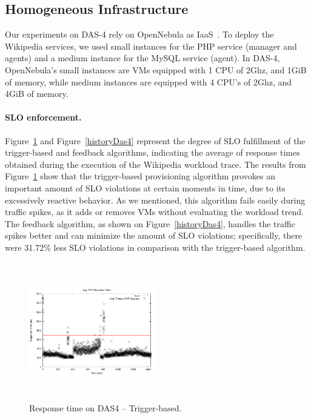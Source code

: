 
\subsection*{Homogeneous Infrastructure}

Our experiments on DAS-4 rely on OpenNebula as
IaaS~\cite{sotomayor_virtual_2009}. To deploy the Wikipedia services,
we used small instances for the PHP service (manager and agents) and a
medium instance for the MySQL service (agent). In DAS-4, OpenNebula's
small instances are VMs equipped with 1 CPU of 2Ghz, and 1GiB of
memory, while medium instances are equipped with 4 CPU's of 2Ghz, and
4GiB of memory.

\paragraph{SLO enforcement.}
Figure~\ref{naiveDas4} and Figure~\ref{historyDas4} represent the
degree of SLO fulfillment of the trigger-based and feedback
algorithms, indicating the average of response times obtained during
the execution of the Wikipedia workload trace. The results from
Figure~\ref{naiveDas4} show that the trigger-based provisioning
algorithm provokes an important amount of SLO violations at certain
moments in time, due to its excessively reactive behavior. As we
mentioned, this algorithm fails easily during traffic spikes, as it
adds or removes VMs without evaluating the workload trend. The
feedback algorithm, as shown on Figure~\ref{historyDas4}, handles the
traffic spikes better and can minimize the amount of SLO violations;
specifically, there were 31.72\% less SLO violations in comparison
with the trigger-based algorithm.


\begin{figure}[t]
\begin{center}
\includegraphics[width=0.49\textwidth, height=6cm]{./images/homogeneous/avgTimeout_PhP_trigger}
\end{center}
\vspace{-5mm}
\caption{Response time on DAS4 -- Trigger-based.}
\label{naiveDas4}
\end{figure}

